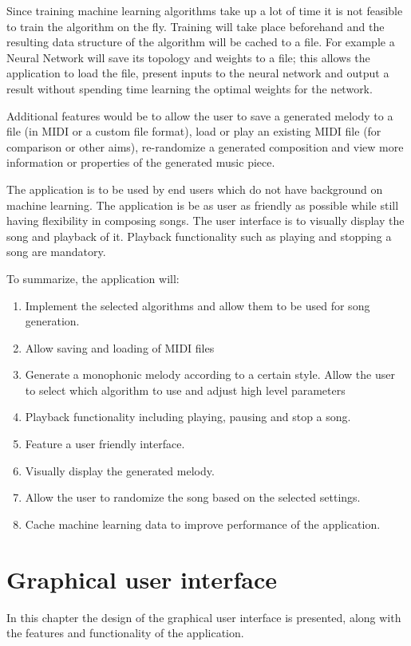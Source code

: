 Since training machine learning algorithms take up a lot of time it is not feasible to train the algorithm on the fly. Training will take place beforehand and the resulting data structure of the algorithm will be cached to a file. 
For example a Neural Network will save its topology and weights to a file; this allows the application to load the file, present inputs to the neural network and output a result without spending time learning the optimal weights for the network.

Additional features would be to allow the user to save a generated melody to a file (in \ac{MIDI} or a custom file format), load or play an existing \ac{MIDI} file (for comparison or other aims), re-randomize a generated composition and view more information or properties of the generated music piece.

The application is to be used by end users which do not have background on machine learning. The application is be as user as friendly as possible while still having flexibility in composing songs. The user interface is to visually display the song and playback of it. Playback functionality such as playing and stopping a song are mandatory.

To summarize, the application will:
\begin{enumerate}
\item Implement the selected algorithms and allow them to be used for song generation.
\item Allow saving and loading of \ac{MIDI} files
\item Generate a monophonic melody according to a certain style. Allow the user to select which algorithm to use and adjust high level parameters
\item Playback functionality including playing, pausing and stop a song. 
\item Feature a user friendly interface.
\item Visually display the generated melody.
\item Allow the user to randomize the song based on the selected settings.
\item Cache machine learning data to improve performance of the application.
\end{enumerate}

\chapter{Graphical user interface}
In this chapter the design of the graphical user interface is presented, along with the features and functionality of the application.

